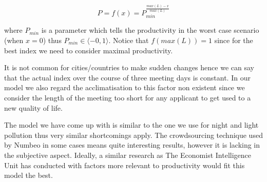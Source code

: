 $$P = f(x) = P_{min}^{\frac{max(L)-x}{max(L)}}$$

\noindent where $P_{min}$ is a parameter which tells the productivity in the worst case scenario  (when $x=0$) thus $ P_{min}\in \langle -0,1\rangle$. Notice that $f(max(L))=1$ since for the best index we need to consider maximal productivity.

It is not common for cities/countries to make sudden changes hence we can say that the actual index over the course of three meeting days is constant. In our model we also regard the acclimatisation to this factor non existent since we consider the length of the meeting too short for any applicant to get used to a new quality of life.


The model we have come up with is similar to the one we use for night and light pollution thus very similar shortcomings apply. The crowdsourcing technique used by Numbeo in some cases means quite interesting results, however it is lacking in the subjective aspect. Ideally, a similar research as The Economist Intelligence Unit has conducted with factors more relevant to productivity would fit this model the best. 